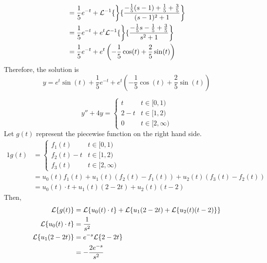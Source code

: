 \documentclass[diffeq.tex]{subfiles}
\begin{document}
\begin{example}
\begin{alignat}{1}
            &= \frac{1}{5}e^{-t} + \mathcal{L}^{-1}\{\left\}\{\frac{-\frac{1}{5}(s - 1) + \frac{1}{5} + \frac{3}{5}}{(s - 1)^{2} + 1}\right\}\\
            &= \frac{1}{5}e^{-t} + e^{t}\mathcal{L}^{-1}\{\left\}\{\frac{-\frac{1}{5}s - \frac{1}{5}+ \frac{3}{5}}{s^{2} + 1}\right\}\\
            &= \frac{1}{5}e^{-t} + e^{t}\left(-\frac{1}{5}\cos(t) + \frac{2}{5}\sin(t)\right)
        \end{alignat}
        Therefore, the solution is
        \begin{equation}
            y = e^{t}\sin(t) + \frac{1}{5}e^{-t} + e^{t}\left(-\frac{1}{5}\cos(t) + \frac{2}{5}\sin(t)\right)
        \end{equation}
    \end{example}
    \begin{example}
        \begin{equation}
            y'' + 4y = \begin{cases}
                t & t \in [0, 1)\\
                2 - t & t \in [1, 2)\\
                0 & t \in [2, \infty)
            \end{cases}
        \end{equation}
        Let $g(t)$ represent the piecewise function on the right hand side.
        \begin{alignat}{1}
            g(t) &= \begin{cases}
                f_{1}(t) & t \in [0, 1)\\
                f_{2}(t) - t & t \in [1, 2)\\
                f_{3}(t) & t \in [2, \infty)
            \end{cases}\\
            &= u_{0}(t)f_{1}(t) + u_{1}(t)\left(f_{2}(t) - f_{1}(t)\right) + u_{2}(t)\left(f_{3}(t) - f_{2}(t)\right)\\
            &= u_{0}(t)\cdot t + u_{1}(t)(2 - 2t) + u_{2}(t)(t - 2)
        \end{alignat}
        Then,
        \begin{alignat}{1}
            \lp{g(t)} &= \lp{u_{0}(t)\cdot t} + \lp{u_{1}(2 - 2t) + \lp{u_{2}(t)(t - 2)}}\\
            \lp{u_{0}(t)\cdot t} &= \frac{1}{s^{2}}\\
            \lp{u_{1}(2 - 2t)} &= e^{-s}\lp{2-2t}\\
            &= -\frac{2e^{-s}}{s^{2}}\\

\end{alignat}
\end{example}
\end{document}
